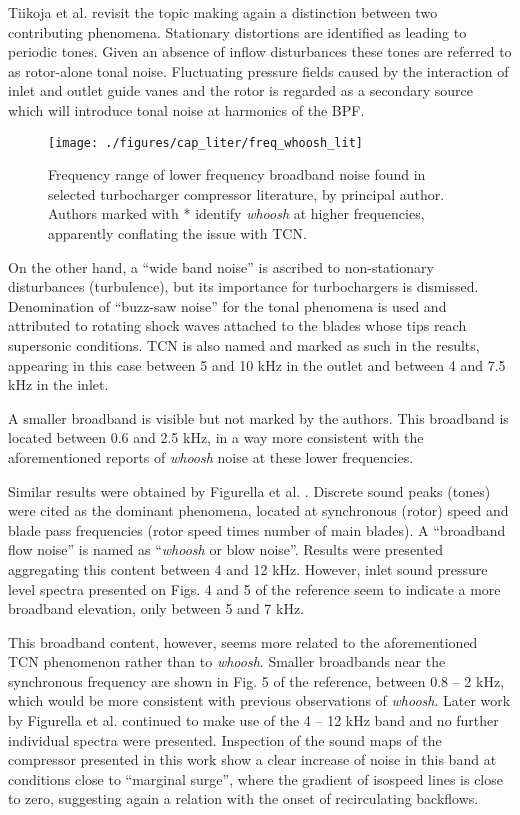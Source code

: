 Tiikoja et al. \cite{tiikoja2011inves} revisit the topic making again a distinction between two contributing phenomena. Stationary distortions are identified as leading to periodic tones. Given an absence of inflow disturbances these tones are referred to as rotor-alone tonal noise. Fluctuating pressure fields caused by the interaction of inlet and outlet guide vanes and the rotor is regarded as a secondary source which will introduce tonal noise at harmonics of the BPF. 

\begin{wrapfigure}{o}[1.5cm]{0.4\textwidth}
\centering
\vspace{2mm}
\texttt{[image: ./figures/cap\_liter/freq\_whoosh\_lit]}
\caption[Range of some broadband noises found in the literature]{Frequency range of lower frequency broadband noise found in selected turbocharger compressor literature, by principal author. Authors marked with * identify \emph{whoosh} at higher frequencies, apparently conflating the issue with TCN.}
\label{fig:freq_whoosh_lit}
\end{wrapfigure}

On the other hand, a ``wide band noise'' is ascribed to non-stationary disturbances (turbulence), but its importance for turbochargers is dismissed. Denomination of ``buzz-saw noise'' for the tonal phenomena is used and attributed to rotating shock waves attached to the blades whose tips reach supersonic conditions. TCN is also named and marked as such in the results, appearing in this case between 5 and 10 kHz in the outlet and between 4 and 7.5 kHz in the inlet. 

A smaller broadband is visible but not marked by the authors. This broadband is located between 0.6 and 2.5 kHz, in a way more consistent with the aforementioned reports of \emph{whoosh} noise at these lower frequencies.

Similar results were obtained by Figurella et al. \cite{figurella2014noise}. Discrete sound peaks (tones) were cited as the dominant phenomena, located at synchronous (rotor) speed and blade pass frequencies (rotor speed times number of main blades). A ``broadband flow noise'' is named as ``\emph{whoosh} or blow noise''. Results were presented aggregating this content between 4 and 12 kHz. However, inlet sound pressure level spectra presented on Figs. 4 and 5 of the reference seem to indicate a more broadband elevation, only between 5 and 7 kHz. 

This broadband content, however, seems more related to the aforementioned TCN phenomenon rather than to \emph{whoosh}. Smaller broadbands near the synchronous frequency are shown in Fig. 5 of the reference, between 0.8 -- 2 kHz, which would be more consistent with previous observations of \emph{whoosh}. Later work by Figurella et al. \cite{figurella2014effect} continued to make use of the 4 -- 12 kHz band and no further individual spectra were presented. Inspection of the sound maps of the compressor presented in this work show a clear increase of noise in this band at conditions close to ``marginal surge'', where the gradient of isospeed lines is close to zero, suggesting again a relation with the onset of recirculating backflows.

